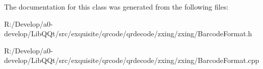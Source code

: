 The documentation for this class was generated from the following files\+:\begin{DoxyCompactItemize}
\item 
R\+:/\+Develop/a0-\/develop/\+Lib\+Q\+Qt/src/exquisite/qrcode/qrdecode/zxing/zxing/Barcode\+Format.\+h\item 
R\+:/\+Develop/a0-\/develop/\+Lib\+Q\+Qt/src/exquisite/qrcode/qrdecode/zxing/zxing/Barcode\+Format.\+cpp\end{DoxyCompactItemize}
